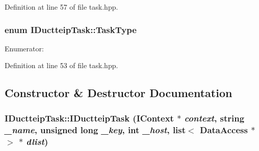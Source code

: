 Definition at line 57 of file task.hpp.\hypertarget{class_i_ductteip_task_a7f8f5e47d9590cb18a31f1b2860154d0}{
\subsubsection[{TaskType}]{\setlength{\rightskip}{0pt plus 5cm}enum {\bf IDuctteipTask::TaskType}}}
\label{class_i_ductteip_task_a7f8f5e47d9590cb18a31f1b2860154d0}
\begin{Desc}
\item[Enumerator: ]\par
\begin{description}
\item[{\em 
\hypertarget{class_i_ductteip_task_a7f8f5e47d9590cb18a31f1b2860154d0a8e4e71fb86fb7236ab752d5a860c8548}{
NormalTask}
\label{class_i_ductteip_task_a7f8f5e47d9590cb18a31f1b2860154d0a8e4e71fb86fb7236ab752d5a860c8548}
}]\item[{\em 
\hypertarget{class_i_ductteip_task_a7f8f5e47d9590cb18a31f1b2860154d0a92cdf4ae80eb4c524b00cbbb3a9a2e0f}{
PropagateTask}
\label{class_i_ductteip_task_a7f8f5e47d9590cb18a31f1b2860154d0a92cdf4ae80eb4c524b00cbbb3a9a2e0f}
}]\end{description}
\end{Desc}



Definition at line 53 of file task.hpp.

\subsection{Constructor \& Destructor Documentation}
\hypertarget{class_i_ductteip_task_af6e8ba2a01f02e8a354831083d27d6c5}{
\subsubsection[{IDuctteipTask}]{\setlength{\rightskip}{0pt plus 5cm}IDuctteipTask::IDuctteipTask ({\bf IContext} $\ast$ {\em context}, \/  string {\em \_\-name}, \/  unsigned long {\em \_\-key}, \/  int {\em \_\-host}, \/  list$<$ {\bf DataAccess} $\ast$ $>$ $\ast$ {\em dlist})}}
\label{class_i_ductteip_task_af6e8ba2a01f02e8a354831083d27d6c5}


